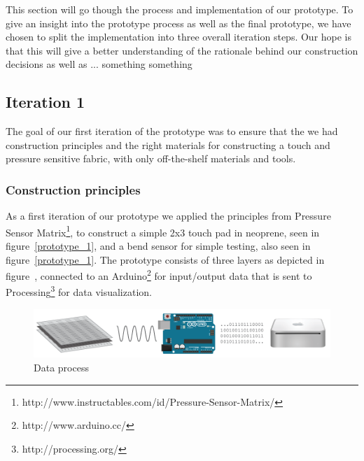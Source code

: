 This section will go though the process and implementation of our prototype.
To give an insight into the prototype process as well as the final prototype, we have chosen to split the implementation into three overall iteration steps.
Our hope is that this will give a better understanding of the rationale behind our construction decisions as well as ... something something 


\subsection{Iteration 1}
\label{ch:textiletouch:it1}
The goal of our first iteration of the prototype was to ensure that the we had construction principles and the right materials for constructing a touch and pressure sensitive fabric, with only off-the-shelf materials and tools.

\subsubsection{Construction principles}
As a first iteration of our prototype we applied the principles from Pressure Sensor Matrix\footnote{http://www.instructables.com/id/Pressure-Sensor-Matrix/}, to construct a simple 2x3 touch pad in neoprene, seen in figure~\ref{prototype_1}, and a bend sensor for simple testing, also seen in figure~\ref{prototype_1}.
The prototype consists of three layers as depicted in figure~, connected to an Arduino\footnote{http://www.arduino.cc/} for input/output data that is sent to Processing\footnote{http://processing.org/} for data visualization.

\begin{figure}[h]
  \centering
      \includegraphics[width=\textwidth]{figures/touch/process}
  \caption{Data process}
   \label{data-process}
\end{figure}

